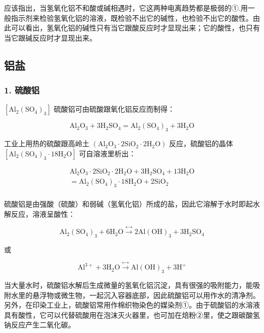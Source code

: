 应该指出，当氢氧化铝不和酸或碱相遇时，它这两种电离趋势都是极弱的①.用一般指示剂来检验氢氧化铝的溶液，既检验不出它的碱性，也检验不出它的酸性。由此可以看出，氢氧化铝的碱性只有当它跟酸反应时才显现出来；它的酸性，也只有当它跟碱反应时才显现出来。

\subsection{铝盐}

\subsubsection{1. 硫酸铝}

\(\left[\mathrm{Al}_{2}\left(\mathrm{SO}_{4}\right)_{3}\right]\)
硫酸铝可由硫酸跟氧化铝反应而制得：

\[
\mathrm{Al} _ {2} \mathrm{O} _ {3} + 3 \mathrm{H} _ {2} \mathrm{SO} _ {4} = \mathrm{Al} _ {2} (\mathrm{SO} _ {4}) _ {3} + 3 \mathrm{H} _ {2} \mathrm{O}
\]

工业上用热的硫酸跟高岭土
\(\left(\mathrm{Al}_{2}\mathrm{O}_{3}\cdot2\mathrm{SiO}_{2}\cdot2\mathrm{H}_{2}\mathrm{O}\right)\)
反应，硫酸铝的晶体
\(\left[\mathrm{Al}_{2}\left(\mathrm{SO}_{4}\right)_{3}\cdot18\mathrm{H}_{2}\mathrm{O}\right]\)
可自溶液里析出：

\[
\begin{array}{l} \mathrm{Al} _ {2} \mathrm{O} _ {3} \cdot 2 \mathrm{SiO} _ {2} \cdot 2 \mathrm{H} _ {2} \mathrm{O} + 3 \mathrm{H} _ {2} \mathrm{SO} _ {4} + 13 \mathrm{H} _ {2} \mathrm{O} \\ = \mathrm{Al} _ {2} (\mathrm{SO} _ {4}) _ {3} \cdot 18 \mathrm{H} _ {2} \mathrm{O} + 2 \mathrm{SiO} _ {2} \\ \end{array}
\]

硫酸铝是由强酸（硫酸）和弱碱（氢氧化铝）所成的盐，因此它溶解于水时即起水解反应，溶液呈酸性：

\[
\mathrm{Al} _ {2} (\mathrm{SO} _ {4}) _ {3} + 6 \mathrm{H} _ {2} \mathrm{O} \xrightarrow {\longleftrightarrow} 2 \mathrm{Al} (\mathrm{OH}) _ {3} + 3 \mathrm{H} _ {2} \mathrm{SO} _ {4}
\]

或

\[
\mathrm{Al} ^{3+} + 3 \mathrm{H} _ {2} \mathrm{O} \xrightarrow {\longleftrightarrow} \mathrm{Al} (\mathrm{OH}) _ {3} + 3 \mathrm{H} ^ {+}
\]

当大量水时，硫酸铝水解后生成微量的氢氧化铝沉淀，具有很强的吸附能力，能吸附水里的悬浮物或微生物，一起沉入容器底部，因此硫酸铝可以用作水的清净剂。另外，在印染工业上，硫酸铝常用作棉织物染色的媒染剂①。由于硫酸铝的水溶液具有酸性，它可以代替硫酸用在泡沫灭火器里，也可加在焙粉②里，使之跟碳酸氢钠反应产生二氧化碳。


